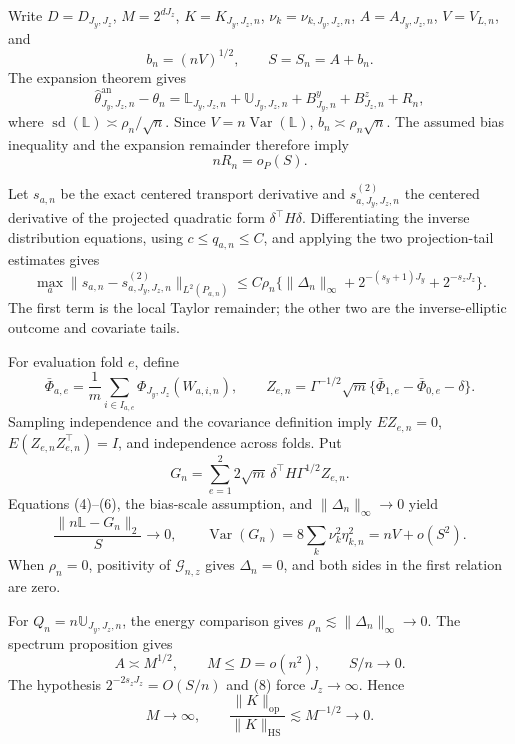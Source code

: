 Write \(D=D_{J_y,J_z}\), \(M=2^{dJ_z}\), \(K=K_{J_y,J_z,n}\), \(\nu_k=\nu_{k,J_y,J_z,n}\), \(A=A_{J_y,J_z,n}\), \(V=V_{L,n}\), and
\[
b_n=(nV)^{1/2},\qquad S=S_n=A+b_n.                    \tag{1}
\]
The expansion theorem gives
\[
\widehat\theta^{\mathrm{an}}_{J_y,J_z,n}-\theta_n
=\mathbb L_{J_y,J_z,n}+\mathbb U_{J_y,J_z,n}
+B^y_{J_y,n}+B^z_{J_z,n}+R_n,                        \tag{2}
\]
where \(\operatorname{sd}(\mathbb L)\asymp\rho_n/\sqrt n\). Since \(V=n\operatorname{Var}(\mathbb L)\), \(b_n\asymp\rho_n\sqrt n\). The assumed bias inequality and the expansion remainder therefore imply
\[
nR_n=o_P(S).                                         \tag{3}
\]

Let \(s_{a,n}\) be the exact centered transport derivative and \(s^{(2)}_{a,J_y,J_z,n}\) the centered derivative of the projected quadratic form \(\delta^\top H\delta\). Differentiating the inverse distribution equations, using \(c\le q_{a,n}\le C\), and applying the two projection-tail estimates gives
\[
\max_a\|s_{a,n}-s^{(2)}_{a,J_y,J_z,n}\|_{L^2(P_{a,n})}
\le C\rho_n\{\|\Delta_n\|_\infty+
2^{-(s_y+1)J_y}+2^{-s_zJ_z}\}.                       \tag{4}
\]
The first term is the local Taylor remainder; the other two are the inverse-elliptic outcome and covariate tails.

For evaluation fold \(e\), define
\[
\bar\Phi_{a,e}=\frac1m\sum_{i\in I_{a,e}}\Phi_{J_y,J_z}(W_{a,i,n}),
\qquad
Z_{e,n}=\Gamma^{-1/2}\sqrt m
\{\bar\Phi_{1,e}-\bar\Phi_{0,e}-\delta\}.             \tag{5}
\]
Sampling independence and the covariance definition imply \(EZ_{e,n}=0\), \(E(Z_{e,n}Z_{e,n}^{\top})=I\), and independence across folds. Put
\[
G_n=\sum_{e=1}^2 2\sqrt m\,\delta^\top
H\Gamma^{1/2}Z_{e,n}.                                \tag{6}
\]
Equations (4)--(6), the bias-scale assumption, and \(\|\Delta_n\|_\infty\to0\) yield
\[
\frac{\|n\mathbb L-G_n\|_2}{S}\to0,\qquad
\operatorname{Var}(G_n)=8\sum_k\nu_k^2\eta_{k,n}^2
=nV+o(S^2).                                          \tag{7}
\]
When \(\rho_n=0\), positivity of \(\mathcal G_{n,z}\) gives \(\Delta_n=0\), and both sides in the first relation are zero.

For \(Q_n=n\mathbb U_{J_y,J_z,n}\), the energy comparison gives \(\rho_n\lesssim\|\Delta_n\|_\infty\to0\). The spectrum proposition gives
\[
A\asymp M^{1/2},\qquad M\le D=o(n^2),\qquad S/n\to0.  \tag{8}
\]
The hypothesis \(2^{-2s_zJ_z}=O(S/n)\) and (8) force \(J_z\to\infty\). Hence
\[
M\to\infty,\qquad
\frac{\|K\|_{\mathrm{op}}}{\|K\|_{\mathrm{HS}}}
\lesssim M^{-1/2}\to0.                               \tag{9}
\]

